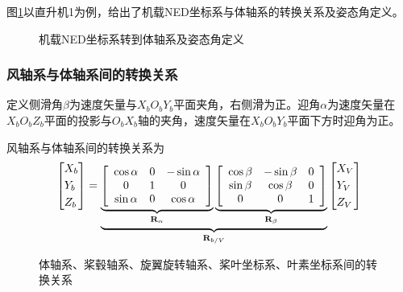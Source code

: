 图\ref{body}以直升机1为例，给出了机载NED坐标系与体轴系的转换关系及姿态角定义。

\begin{figure}[htb!]
  \subfloat[绕$Z$轴旋转]{}\quad
  \subfloat[绕$Y$轴旋转]{}
  \subfloat[绕$X$轴旋转]{}
  \caption{机载NED坐标系转到体轴系及姿态角定义\label{body}}
\end{figure}

\subsubsection{风轴系与体轴系间的转换关系}
定义侧滑角$\beta$为速度矢量与$X_bO_bY_b$平面夹角，右侧滑为正。迎角$\alpha$为速度矢量在$X_bO_bZ_b$平面的投影与$O_bX_b$轴的夹角，速度矢量在$X_bO_bY_b$平面下方时迎角为正。

风轴系与体轴系间的转换关系为
\begin{equation}
  \left[ \begin{gathered}
    {X_b} \hfill \\
    {Y_b} \hfill \\
    {Z_b} \hfill \\ 
  \end{gathered}  \right] = \underbrace {\underbrace {\left[ {\begin{array}{*{20}{c}}
    {\cos \alpha }&0&{ - \sin \alpha } \\ 
    0&1&0 \\ 
    {\sin \alpha }&0&{\cos \alpha } 
  \end{array}} \right]}_{{{\mathbf{R}}_\alpha }}\underbrace {\left[ {\begin{array}{*{20}{c}}
    {\cos \beta }&{ - \sin \beta }&0 \\ 
    {\sin \beta }&{\cos \beta }&0 \\ 
    0&0&1 
  \end{array}} \right]}_{{{\mathbf{R}}_\beta }}}_{{{\mathbf{R}}_{b/V}}}\left[ \begin{gathered}
    {X_V} \hfill \\
    {Y_V} \hfill \\
    {Z_V} \hfill \\ 
  \end{gathered}  \right]
\end{equation}

\begin{figure}[htb!]
  \subfloat[桨轴前倾角]{}\quad
  \subfloat[旋翼旋转轴系]{}\quad
  \subfloat[桨叶坐标系]{}\quad\quad
  \subfloat[叶素坐标系]{}
  \caption{体轴系、桨毂轴系、旋翼旋转轴系、桨叶坐标系、叶素坐标系间的转换关系\label{rotor}}
\end{figure}
